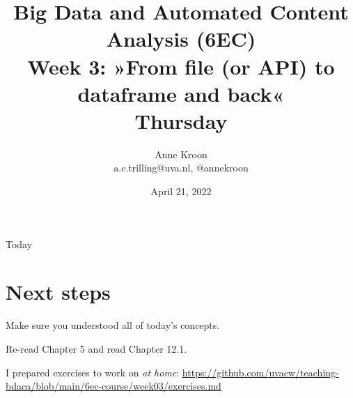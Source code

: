 

\graphicspath{{../../resources/img/}}




\title[Big Data and Automated Content Analysis]{\textbf{Big Data and Automated Content Analysis (6EC)} 
\\Week 3: »From file (or API) to dataframe and back«
\\Thursday}
\author[Anne Kroon]{Anne Kroon\\ \footnotesize{a.c.trilling@uva.nl, @annekroon \\}}
\date{April 21, 2022}


\begin{frame}{}
	\titlepage
\end{frame}

\begin{frame}{Today}
	\tableofcontents
\end{frame}



	










\section{Next steps}




\begin{frame}[standout]
Make sure you understood all of today's concepts.

Re-read Chapter 5 and read Chapter 12.1. 

I prepared exercises to work on \emph{at home}:
\large{\url{https://github.com/uvacw/teaching-bdaca/blob/main/6ec-course/week03/exercises.md}}
\end{frame}





\begin{frame}
	\printbibliography
\end{frame}



